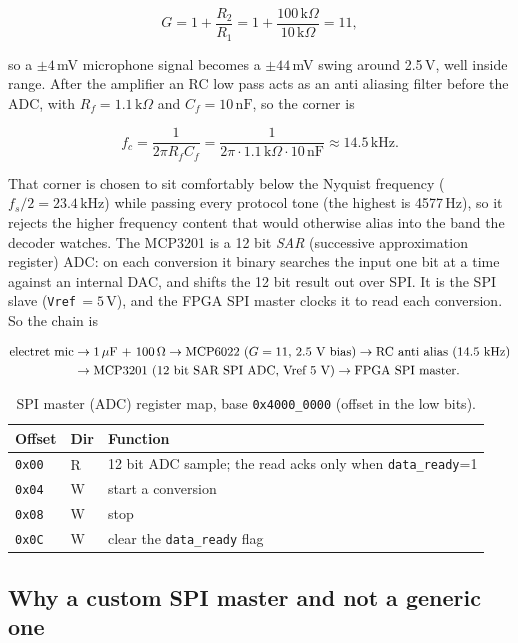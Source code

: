 \documentclass[a4paper,11pt]{article}
\begin{document}
\[
G = 1 + \frac{R_2}{R_1} = 1 + \frac{100\,\mathrm{k}\Omega}{10\,\mathrm{k}\Omega} = 11,
\]

so a $\pm 4$\,mV microphone signal becomes a $\pm 44$\,mV swing around 2.5\,V, well
inside range. After the amplifier an RC low pass acts as an anti aliasing filter
before the ADC, with $R_f = 1.1\,\mathrm{k}\Omega$ and $C_f = 10\,\mathrm{nF}$, so
the corner is

\[
f_c = \frac{1}{2\pi R_f C_f} = \frac{1}{2\pi \cdot 1.1\,\mathrm{k}\Omega \cdot 10\,\mathrm{nF}}
    \approx 14.5\,\mathrm{kHz}.
\]

That corner is chosen to sit comfortably below the Nyquist frequency
($f_s/2 = 23.4\,\mathrm{kHz}$) while passing every protocol tone (the highest is
4577\,Hz), so it rejects the higher frequency content that would otherwise alias
into the band the decoder watches. The MCP3201 is a 12 bit \emph{SAR} (successive
approximation register) ADC: on each conversion it binary searches the input one
bit at a time against an internal DAC, and shifts the 12 bit result out over SPI.
It is the SPI slave (\texttt{Vref}\,$=5$\,V), and the FPGA SPI master clocks it to
read each conversion. So the chain is

\[
\begin{aligned}
\text{electret mic} &\rightarrow \text{1\,$\mu$F + 100\,$\Omega$} \rightarrow \text{MCP6022 ($G=11$, 2.5 V bias)} \rightarrow \text{RC anti alias (14.5 kHz)}\\
&\rightarrow \text{MCP3201 (12 bit SAR SPI ADC, Vref 5 V)} \rightarrow \text{FPGA SPI master}.
\end{aligned}
\]

\begin{table}[H]
\centering
\caption{SPI master (ADC) register map, base \texttt{0x4000\_0000} (offset in the low bits).}
\begin{tabular}{lll}
\toprule
\textbf{Offset} & \textbf{Dir} & \textbf{Function} \\
\midrule
\texttt{0x00} & R & 12 bit ADC sample; the read acks only when \texttt{data\_ready}=1 \\
\texttt{0x04} & W & start a conversion \\
\texttt{0x08} & W & stop \\
\texttt{0x0C} & W & clear the \texttt{data\_ready} flag \\
\bottomrule
\end{tabular}
\end{table}

\subsection{Why a custom SPI master and not a generic one}
\end{document}
